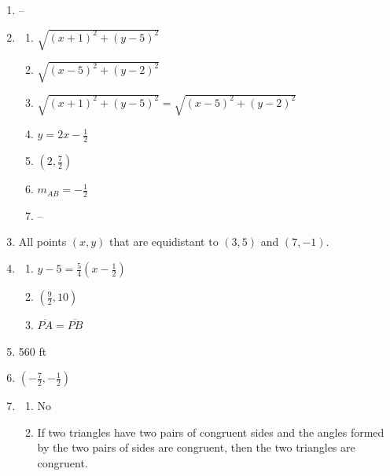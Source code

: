 \documentclass{article}
\begin{document}
\begin{enumerate}
\item --

\item 
	\begin{enumerate}
	
	\item $\sqrt{(x + 1)^2 + (y - 5)^2}$
	
	\item $\sqrt{(x - 5)^2 + (y - 2)^2}$
	
	\item $\sqrt{(x + 1)^2 + (y - 5)^2} = \sqrt{(x - 5)^2 + (y - 2)^2}$
	
	\item $y = 2x - \frac{1}{2}$
	
	\item $(2, \frac{7}{2})$
	
	\item $m_{AB} = -\frac{1}{2}$
	
	\item --
	
	\end{enumerate}
	
\item All points $(x, y)$ that are equidistant to $(3,5)$ and $(7, -1)$.

\item 
	\begin{enumerate}
	
	\item $y - 5 = \frac{5}{4}(x - \frac{1}{2})$
	
	\item $(\frac{9}{2}, 10)$ 
	
	\item $\overline{PA} = \overline{PB}$

	\end{enumerate}
	
\item 560 ft

\item $(-\frac{7}{2}, -\frac{1}{2})$

\item
	\begin{enumerate}
	
	\item No
	
	\item If two triangles have two pairs of congruent sides and the angles formed by the two pairs of sides are congruent, then the two triangles are congruent.
	

\end{enumerate}
\end{enumerate}
\end{document}
